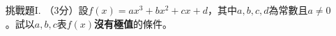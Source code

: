 \documentclass[12pt]{article}
\begin{document}
\begin{enumerate}
        \hrulefill

        \hrulefill

        \hrulefill

        \hrulefill

        \hrulefill

        \hrulefill

        \hrulefill

        \hrulefill

        \hrulefill

        \hrulefill

        \hrulefill

        \hrulefill

        \hrulefill

        \hrulefill

        \hrulefill

        \hrulefill

        \hrulefill

        \hrulefill

        \hrulefill

        \hrulefill

        \hrulefill

        \hrulefill

        \hrulefill

        \hrulefill

        \hrulefill

        \hrulefill

        \hrulefill

        \hrulefill

        \hrulefill
        \item[挑戰題I.] （3分）設$f(x)=ax^3+bx^2+cx+d$，其中$a,b,c,d$為常數且$a\neq 0$。試以$a,b,c$表$f(x)$\textbf{沒有極值}的條件。

        \hrulefill

        \hrulefill

        \hrulefill

        \hrulefill

        \hrulefill

        \hrulefill

        \hrulefill

        \hrulefill

        \hrulefill

        \hrulefill

        \hrulefill

        \hrulefill


\end{enumerate}
\end{document}
